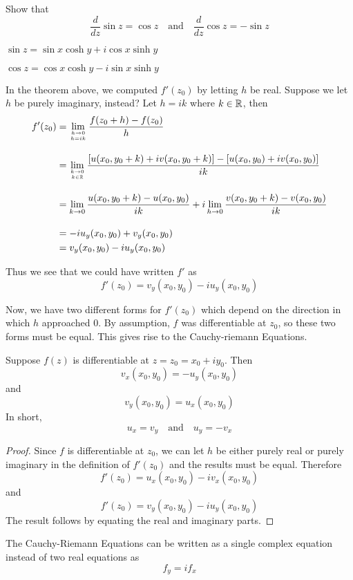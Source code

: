 \documentclass[handout]{ximera}
\begin{document}
\begin{problem}
Show that
\[
\frac{d}{dz} \sin z = \cos z \quad \mbox{and} \quad \frac{d}{dz} \cos z = -\sin z
\]
\begin{hint}
$\sin z = \sin x \cosh y + i \cos x \sinh y$
\end{hint}
\begin{hint}
$\cos z = \cos x \cosh y - i \sin x \sinh y$
\end{hint}
\end{problem}

In the theorem above, we computed $f'(z_0)$ by letting $h$ be real.  Suppose we let $h$ be purely imaginary, instead?
Let $h = ik$ where $k \in \mathbb R$, then
\begin{align*}
f'(z_0) &= \lim_{h \to 0 \atop h = ik} \frac{f(z_0 + h) -f(z_0)}{h} \\[10pt]
        &= \lim_{k \to 0 \atop k \in \mathbb R} \frac{\left[u(x_0 , y_0+k) + iv(x_0 , y_0+k)\right] - \left[u(x_0,y_0)+iv(x_0, y_0)\right]}{ik} \\[10pt]
        &=  \lim_{k \to 0} \frac{u(x_0 , y_0+k)- u(x_0,y_0)}{ik} +i\lim_{h \to 0}\frac{v(x_0 , y_0+k)-v(x_0, y_0)}{ik} \\[10pt]
        &= -iu_y(x_0,y_0) + v_y(x_0,y_0)\\
        &=  v_y(x_0,y_0)-iu_y(x_0,y_0)
\end{align*}

Thus we see that we could have written $f'$ as
\[
f'(z_0) = v_y(x_0,y_0)-iu_y(x_0,y_0)
\]

Now, we have two different forms for $f'(z_0)$ which depend on the direction in which $h$ approached $0$.
By assumption, $f$ was differentiable at $z_0$, so these two forms must be equal. This gives rise to the Cauchy-riemann Equations.
\begin{theorem}
Suppose $f(z)$ is differentiable at $z = z_0 = x_0 +iy_0$. Then
\[
v_x(x_0,y_0)= -u_y(x_0,y_0) 
\]
and 
\[
v_y(x_0,y_0) = u_x(x_0,y_0)
\]
In short, 
\[
u_x =v_y \quad \mbox{and} \quad u_y = -v_x
\]
\end{theorem}
\begin{proof}
Since $f$ is differentiable at $z_0$, we can let $h$ be either purely real or purely imaginary in the definition of $f'(z_0)$
and the results must be equal. Therefore
\[
f'(z_0) = u_x(x_0,y_0)-iv_x(x_0,y_0)
\]
and
\[
f'(z_0) = v_y(x_0,y_0)-iu_y(x_0,y_0)
\]
The result follows by equating the real and imaginary parts.
\end{proof}
\begin{remark}
The Cauchy-Riemann Equations can be written as a single complex equation instead of two real equations as
\[
f_y = if_x
\]
\end{remark}
\end{document}
